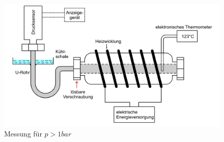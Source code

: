 \documentclass{scrartcl}
\begin{document}
\begin{figure}
  \centering
  \includegraphics[width=\textwidth]{bild4.jpg}

  \caption{Messung für $p>1bar$}
 
  \label{fig:plot3}
\end{figure}
\end{document}
